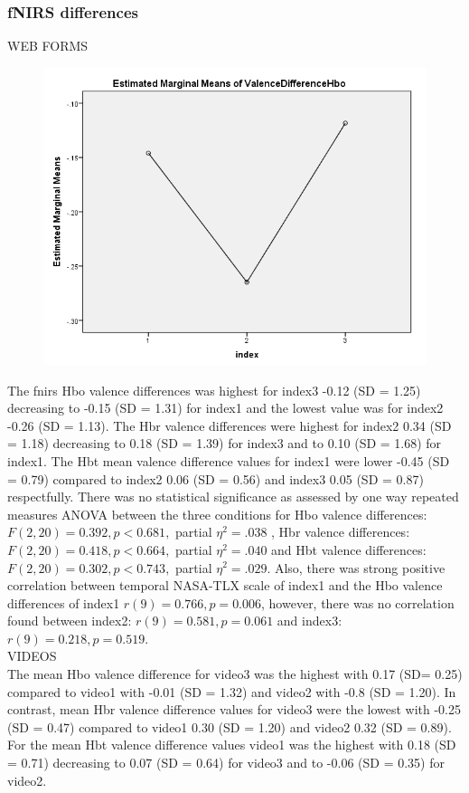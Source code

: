 \documentclass[a4paper]{report}
\begin{document}
			\subsubsection{fNIRS differences}
			WEB FORMS\\			
				\begin{figure}[h]
					\centering
					\includegraphics[width=0.7\linewidth]{hbo-valence-differences-index123}
					\caption{}
					\label{fig:hbo-valence-differences-index123}
				\end{figure}
				The fnirs Hbo valence differences was highest for index3 -0.12 (SD = 1.25) decreasing to -0.15 (SD = 1.31) for index1 and the lowest value was for  index2 -0.26 (SD = 1.13).
				The Hbr valence differences were highest for index2 0.34 (SD = 1.18) decreasing to 0.18 (SD = 1.39) for index3 and to 0.10 (SD = 1.68) for index1.
				The Hbt mean valence difference values for index1 were lower -0.45 (SD = 0.79) compared to index2 0.06 (SD = 0.56) and index3 0.05 (SD = 0.87) respectfully. There was no statistical significance as assessed by one way repeated measures ANOVA between the three conditions for Hbo valence differences: $F(2,20)=0.392, p<0.681,$ partial $\eta^{2}=.038$ , Hbr valence differences: $F(2,20)=0.418, p<0.664,$ partial $\eta^{2}=.040$ and Hbt valence differences: $F(2,20)=0.302, p<0.743,$ partial $\eta^{2}=.029$. Also, there was strong positive correlation between temporal NASA-TLX scale of index1 and the Hbo valence differences of index1 $r(9)=0.766, p=0.006$, however, there was no correlation found between index2: $r(9)=0.581, p=0.061$ and index3: $r(9)=0.218, p=0.519$.\\
			VIDEOS\\
				The mean Hbo valence difference for video3 was the highest with 0.17 (SD= 0.25) compared to video1 with -0.01 (SD = 1.32) and video2 with -0.8 (SD = 1.20). In contrast, mean Hbr valence difference values for video3 were the lowest with -0.25 (SD = 0.47) compared to video1 0.30 (SD = 1.20) and video2 0.32 (SD = 0.89). For the mean Hbt valence difference values video1 was the highest with 0.18 (SD = 0.71) decreasing to 0.07 (SD = 0.64) for video3 and to -0.06 (SD = 0.35) for video2.\\
\end{document}
